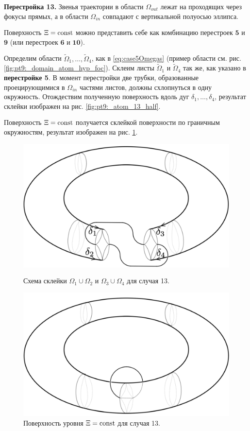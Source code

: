 \textbf{Перестройка 13.}
Звенья траектории в области $\Omega_{out}$ лежат на проходящих через фокусы прямых, а в области $\Omega_{in}$ совпадают с вертикальной полуосью эллипса.

Поверхность $\Xi = \mathrm{const}$ можно представить себе как комбинацию перестроек $\textbf{5}$ и $\textbf{9}$ (или перестроек $\textbf{6}$ и $\textbf{10}$).

Определим области $\widetilde{\Omega}_1, \ldots, \widetilde{\Omega}_4$, как в \eqref{eq:case5Omegas} (пример области см. рис. \ref{fig:pt9:_domain_atom_hyp_foc}).
Склеим листы $\widetilde{\Omega}_1$ и  $\widetilde{\Omega}_4$ так же, как указано в \textbf{перестройке 5}. В момент перестройки две трубки, образованные проецирующимися в $\Omega_{in}$ частями листов, должны схлопнуться в одну окружность. Отождествим полученную поверхность вдоль дуг $\delta_1, \ldots, \delta_4$, результат склейки изображен на  рис. \ref{fig:pt9:_atom_13_half}.

Поверхность $\Xi = \mathrm{const}$ получается склейкой поверхности по граничным окружностям, результат изображен на рис. \ref{fig:pt9:_atom_13}.

\begin{figure}[!htb]
\centering
\includegraphics[scale=0.1]{images/ch4/section2/atoms/atom_13_half.pdf}
    \caption{Схема склейки $\Omega_1 \cup \Omega_2$ и $\Omega_3 \cup \Omega_4$ для случая 13.}
    \label{fig:pt9:_atom_13_half}
\endminipage\hfill
{}
\centering
\includegraphics[scale=0.1]{images/ch4/section2/atoms/atom_13.pdf}
    \caption{Поверхность уровня $\Xi = \mathrm{const}$ для случая 13.}
    \label{fig:pt9:_atom_13}
\endminipage\hfill
\end{figure}

